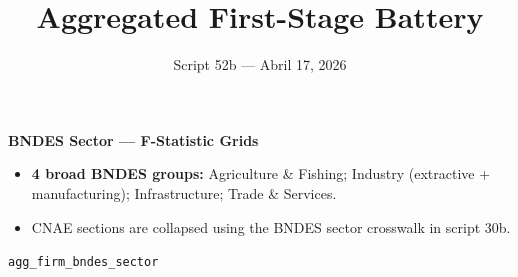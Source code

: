 \documentclass[aspectratio=169,10pt]{beamer}
\title{Aggregated First-Stage Battery}
\subtitle{Script 52b --- Abril 17, 2026}
\author{}
\date{}
\begin{document}
\begin{frame}
\titlepage
\end{frame}


\begin{frame}[plain]
\begin{center}
{\Large\textbf{BNDES Sector --- F-Statistic Grids}}\\[0.5em]
\end{center}
\small
\begin{itemize}
\item \textbf{4 broad BNDES groups:} Agriculture \& Fishing; Industry (extractive + manufacturing); Infrastructure; Trade \& Services.
\item CNAE sections are collapsed using the BNDES sector crosswalk in script 30b.
\end{itemize}
\vfill
\begin{center}
{\scriptsize \texttt{agg\_firm\_bndes\_sector}}
\end{center}
\end{frame}
\end{document}
